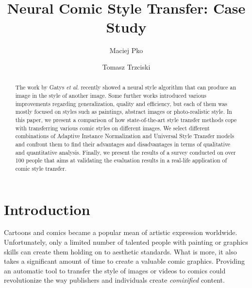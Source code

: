 \documentclass{llncs}
\begin{document}
\title{Neural Comic Style Transfer: Case Study}
%

\author{Maciej Pko \and Tomasz Trzciski}
%

\maketitle              %

\begin{abstract}
The work by Gatys \textit{et al}. \cite{gatys:} recently showed a neural style algorithm that can produce an image in the style of another image. Some further works introduced various improvements regarding generalization, quality and efficiency, but each of them was mostly focused on styles such as paintings, abstract images or photo-realistic style. In this paper, we present a comparison of how state-of-the-art style transfer methods cope with transferring various comic styles on different images. We select different combinations of Adaptive Instance Normalization \cite{huang:belongie} and Universal Style Transfer \cite{universal:style} models and confront them to find their advantages and disadvantages in terms of qualitative and quantitative analysis. Finally, we present the results of a survey conducted on over 100 people that aims at validating the evaluation results in a real-life application of comic style transfer.

\end{abstract}

%
\section{Introduction}
%
Cartoons and comics became a popular mean of artistic expression worldwide. Unfortunately, only a limited number of talented people with painting or graphics skills can create them holding on to aesthetic standards. What is more, it also takes a significant amount of time to create a valuable comic graphics. Providing an automatic tool to transfer the style of images or videos to comics could revolutionize the way publishers and individuals create {\it comixified} content.%
\end{document}
